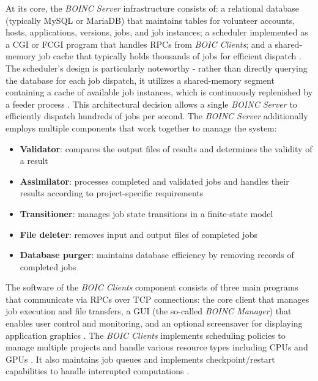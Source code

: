 At its core, the \emph{\ac{BOINC} Server} infrastructure consists of: a relational database (typically MySQL or MariaDB) that maintains tables for volunteer accounts, hosts, applications, versions, jobs, and job instances; a scheduler implemented as a \ac{CGI} or \ac{FCGI} program that handles \acs{RPC}s from \emph{\ac{BOIC} Clients}; and a shared-memory job cache that typically holds thousands of jobs for efficient dispatch \cite{relatedwork:boinc1}. The scheduler's design is particularly noteworthy - rather than directly querying the database for each job dispatch, it utilizes a shared-memory segment containing a cache of available job instances, which is continuously replenished by a feeder process \cite{relatedwork:boinc1}. This architectural decision allows a single \emph{\ac{BOINC} Server} to efficiently dispatch hundreds of jobs per second. The \emph{\ac{BOINC} Server} additionally employs multiple components that work together to manage the system:
\begin{itemize}
    \item \textbf{Validator}: compares the output files of results and determines the validity of a result
    \item \textbf{Assimilator}: processes completed and validated jobs and handles their results according to project-specific requirements
    \item \textbf{Transitioner}: manages job state transitions in a finite-state model
    \item \textbf{File deleter}: removes input and output files of completed jobs
    \item \textbf{Database purger}: maintains database efficiency by removing records of completed jobs
\end{itemize}

The software of the \emph{\ac{BOIC} Clients} component consists of three main programs that communicate via \acs{RPC}s over \acs{TCP} connections: the core client that manages job execution and file transfers, a \ac{GUI} (the so-called \emph{\ac{BOINC} Manager}) that enables user control and monitoring, and an optional screensaver for displaying application graphics \cite{relatedwork:boinc1}. The \emph{\ac{BOIC} Clients} implements scheduling policies to manage multiple projects and handle various resource types including \acs{CPU}s and \acs{GPU}s \cite{relatedwork:boinc1}. It also maintains job queues and implements checkpoint/restart capabilities to handle interrupted computations \cite{relatedwork:boinc1}. 

